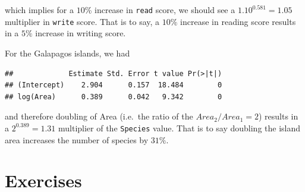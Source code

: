 \documentclass[]{book}
\newenvironment{Shaded}{\begin{snugshade}}{\end{snugshade}}
\newcommand{\KeywordTok}[1]{\textcolor[rgb]{0.13,0.29,0.53}{\textbf{{#1}}}}
\newcommand{\DataTypeTok}[1]{\textcolor[rgb]{0.13,0.29,0.53}{{#1}}}
\newcommand{\DecValTok}[1]{\textcolor[rgb]{0.00,0.00,0.81}{{#1}}}
\newcommand{\StringTok}[1]{\textcolor[rgb]{0.31,0.60,0.02}{{#1}}}
\newcommand{\NormalTok}[1]{{#1}}
\theoremstyle{definition}
\theoremstyle{definition}
\theoremstyle{remark}
\begin{document}
which implies for a \(10\)\% increase in \texttt{read} score, we should
see a \(1.10^{0.581}=1.05\) multiplier in \texttt{write} score. That is
to say, a \(10\%\) increase in reading score results in a \(5\%\)
increase in writing score.

For the Galapagos islands, we had

\begin{Shaded}
\end{Shaded}

\begin{verbatim}
##             Estimate Std. Error t value Pr(>|t|)
## (Intercept)    2.904      0.157  18.484        0
## log(Area)      0.389      0.042   9.342        0
\end{verbatim}

and therefore doubling of Area (i.e.~the ratio of the
\(Area_{2} / Area_{1} = 2\)) results in a \(2^{0.389}=1.31\) multiplier
of the \texttt{Species} value. That is to say doubling the island area
increases the number of species by \(31\%\).

\section{Exercises}\label{exercises-5}
\end{document}
